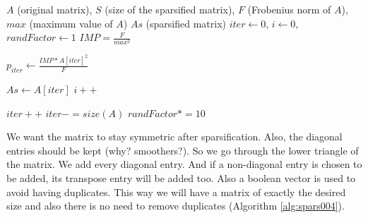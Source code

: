 \begin{algorithm}[H] 
  \footnotesize
  \caption{$As = Sparsify(A, S, F, max)$} \label{alg:spars003} 
  \begin{algorithmic}[1]
    \Require $A$ (original matrix), $S$ (size of the sparsified matrix), $F$ (Frobenius norm of $A$), $max$ (maximum value of $A$) 
    \Ensure  $As$ (sparsified matrix)
    \State $iter \leftarrow 0$, $i \leftarrow 0$, $randFactor \leftarrow 1$ 
    \State $IMP = \frac{F}{max^2}$
    
      \State $p_{iter} \leftarrow \frac{IMP * A[iter]^2}{F}$
      
	\State $As \leftarrow A[iter]$
	\State $i++$
      \EndIf
      
      \State $iter++$
	\State $iter -= size(A)$
	\State $randFactor *= 10$
      \EndIf
      
    \EndWhile
  \end{algorithmic}
\end{algorithm}

We want the matrix to stay symmetric after sparsification. Also, the diagonal entries should be kept (why? smoothers?).
So we go through the lower triangle of the matrix. We add every diagonal entry. And if a non-diagonal entry is 
chosen to be added, its transpose entry will be added too. Also a boolean vector is used to avoid having duplicates.
This way we will have a matrix of exactly the desired size and also there is no need to remove duplicates
(Algorithm \ref{alg:spars004}).

